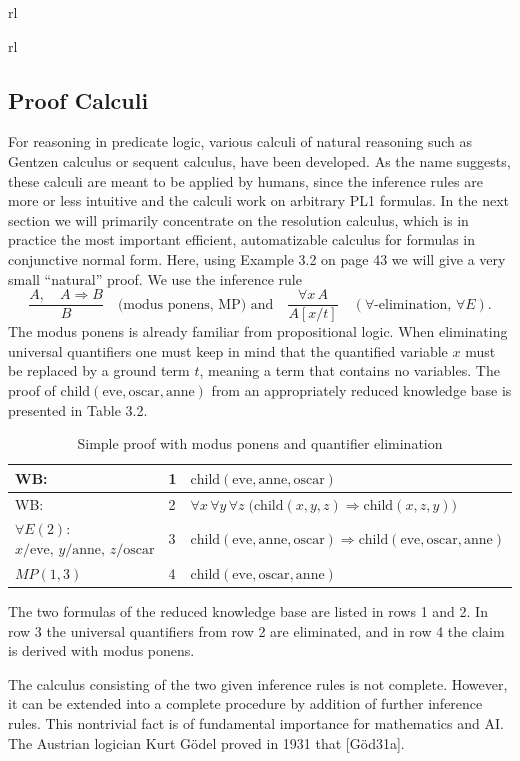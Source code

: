 \documentclass[10pt]{book}
\begin{document}
\begin{center}
\begin{tabular}{rl}
\begin{tabular}{rl}
\subsection{Proof Calculi}
For reasoning in predicate logic, various calculi of natural reasoning such as Gentzen calculus or sequent calculus, have been developed. As the name suggests, these calculi are meant to be applied by humans, since the inference rules are more or less intuitive and the calculi work on arbitrary PL1 formulas. In the next section we will primarily concentrate on the resolution calculus, which is in practice the most important efficient, automatizable calculus for formulas in conjunctive normal form. Here, using Example 3.2 on page 43 we will give a very small ``natural'' proof. We use the inference rule
$$
\frac{A,\quad A \Rightarrow B}{B} \quad \text{(modus ponens, MP) and} \quad \frac{\forall x\, A}{A[x/t]} \quad (\forall\text{-elimination, } \forall E).
$$
The modus ponens is already familiar from propositional logic. When eliminating universal quantifiers one must keep in mind that the quantified variable $x$ must be replaced by a ground term $t$, meaning a term that contains no variables. The proof of $\text{child}(\text{eve}, \text{oscar}, \text{anne})$ from an appropriately reduced knowledge base is presented in Table 3.2.

\begin{table}[htbp]
\centering
\caption{Simple proof with modus ponens and quantifier elimination}
\begin{tabular}{lll}
\hline
WB: & 1 & $\text{child}(\text{eve}, \text{anne}, \text{oscar})$ \\
\hline
WB: & 2 & $\forall x\,\forall y\,\forall z\; \big(\text{child}(x,y,z) \Rightarrow \text{child}(x,z,y)\big)$ \\
\hline
$\forall E(2):$ $x/\text{eve},\, y/\text{anne},\, z/\text{oscar}$ & 3 & $\text{child}(\text{eve}, \text{anne}, \text{oscar}) \Rightarrow \text{child}(\text{eve}, \text{oscar}, \text{anne})$ \\
\hline
$MP(1,3)$ & 4 & $\text{child}(\text{eve}, \text{oscar}, \text{anne})$ \\
\hline
\end{tabular}
\end{table}
The two formulas of the reduced knowledge base are listed in rows 1 and 2. In row 3 the universal quantifiers from row 2 are eliminated, and in row 4 the claim is derived with modus ponens.

The calculus consisting of the two given inference rules is not complete. However, it can be extended into a complete procedure by addition of further inference rules. This nontrivial fact is of fundamental importance for mathematics and AI. The Austrian logician Kurt Gödel proved in 1931 that [Göd31a].


\end{tabular}
\end{tabular}
\end{center}
\end{document}
